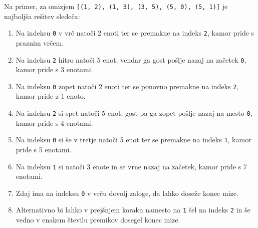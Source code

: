 \documentclass[arhiv]{../izpit}
\begin{document}
Na primer, za omizjem \verb|[(1, 2), (1, 3), (3, 5), (5, 0), (5, 1)]| je najboljša rešitev sledeča:
\begin{enumerate}
  \item Na indeksu \verb|0| v vrč natoči 2 enoti ter se premakne na indeks \verb|2|, kamor pride s praznim vrčem.
  \item Na indeksu \verb|2| hitro natoči 5 enot, vendar ga gost pošlje nazaj na začetek \verb|0|, kamor pride s 3 enotami.
  \item Na indeksu \verb|0| zopet natoči 2 enoti ter se ponovno premakne na indeks \verb|2|, kamor pride z 1 enoto.
  \item Na indeksu \verb|2| si spet natoči 5 enot, gost pa ga zopet pošlje nazaj na mesto \verb|0|, kamor pride s 4 enotami.
  \item Na indeksu \verb|0| si še v tretje natoči 5 enot ter se premakne na indeks \verb|1|, kamor pride s 5 enotami.
  \item Na indeksu \verb|1| si natoči 3 enote in se vrne nazaj na začetek, kamor pride s 7 enotami.
  \item Zdaj ima na indeksu \verb|0| v vrču dovolj zaloge, da lahko doseže konec mize.
  \item Alternativno bi lahko v prejšnjem koraku namesto na \verb|1| šel na indeks \verb|2| in še vedno v enakem številu premikov dosegel konec mize.
\end{enumerate}  
\end{document}
